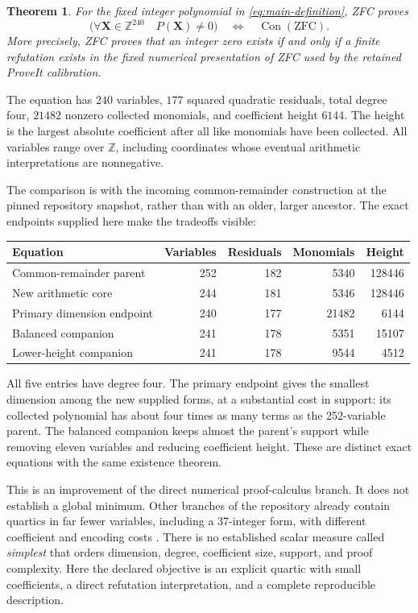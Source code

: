 \documentclass[11pt]{article}
\newtheorem{theorem}{Theorem}[section]
\theoremstyle{definition}\newtheorem{definition}[theorem]{Definition}
\newcommand{\MainVars}{240}
\newcommand{\MainRows}{177}
\newcommand{\MainTerms}{21482}
\newcommand{\MainHeight}{6144}
\begin{document}
\begin{theorem}\label{thm:main}
For the fixed integer polynomial in \eqref{eq:main-definition}, ZFC proves
\[
 \bigl(\forall \mathbf X\in\mathbb Z^{\MainVars}\quad P(\mathbf X)\ne0\bigr)
       \quad\Longleftrightarrow\quad \operatorname{Con}(\mathrm{ZFC}).
\]
More precisely, ZFC proves that an integer zero exists if and only if a
finite refutation exists in the fixed numerical presentation of ZFC used
by the retained ProveIt calibration.
\end{theorem}

The equation has \(\MainVars\) variables, \(\MainRows\) squared quadratic
residuals, total degree four, \(\MainTerms\) nonzero collected monomials,
and coefficient height \(\MainHeight\). The height is the largest absolute
coefficient after all like monomials have been collected. All variables
range over \(\mathbb Z\), including coordinates whose eventual arithmetic
interpretations are nonnegative.

The comparison is with the incoming common-remainder construction at the
pinned repository snapshot, rather than with an older, larger ancestor.
The exact endpoints supplied here make the tradeoffs visible:
\begin{center}
\begin{tabular}{lrrrr}
\hline
Equation & Variables & Residuals & Monomials & Height\\
\hline
Common-remainder parent &252&182&5340&128446\\
New arithmetic core &244&181&5346&128446\\
Primary dimension endpoint &\MainVars&\MainRows&\MainTerms&\MainHeight\\
Balanced companion &241&178&5351&15107\\
Lower-height companion &241&178&9544&4512\\
\hline
\end{tabular}
\end{center}
All five entries have degree four. The primary endpoint gives the smallest
dimension among the new supplied forms, at a substantial cost in support:
its collected polynomial has about four times as many terms as the
252-variable parent. The balanced companion keeps almost the parent's
support while removing eleven variables and reducing coefficient height.
These are distinct exact equations with the same existence theorem.

This is an improvement of the direct numerical proof-calculus branch. It
does not establish a global minimum. Other branches of the repository
already contain quartics in far fewer variables, including a 37-integer
form, with different coefficient and encoding costs \cite{overview}.
There is no established scalar measure called \emph{simplest} that orders
dimension, degree, coefficient size, support, and proof complexity.
Here the declared objective is an explicit quartic with small coefficients,
a direct refutation interpretation, and a complete reproducible description.
\end{document}

